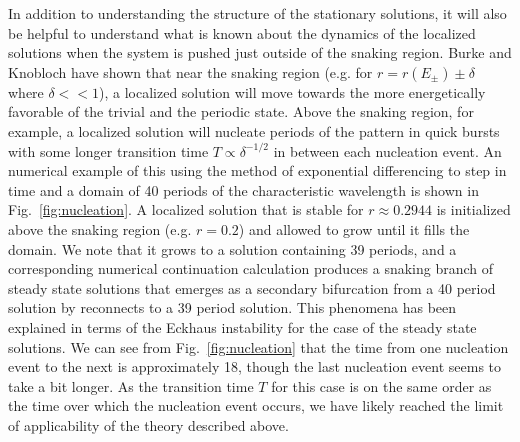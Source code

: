 \documentclass[pre,preprint,superscriptaddress]{revtex4-1}
\begin{document}
In addition to understanding the structure of the stationary solutions, it will also be helpful to understand what is known about the dynamics of the localized solutions when the system is pushed just outside of the snaking region.  Burke and Knobloch \cite{} have shown that near the snaking region (e.g. for $r=r(E_{\pm})\pm\delta$ where $\delta <<1$), a localized solution will move towards the more energetically favorable of the trivial and the periodic state.  Above the snaking region, for example, a localized solution will nucleate periods of the pattern in quick bursts with some longer transition time $T\propto \delta^{-1/2}$ in between each nucleation event.  An numerical example of this using the method of exponential differencing \cite{} to step in time and a domain of 40 periods of the characteristic wavelength is shown in Fig.~\ref{fig:nucleation}.  A localized solution that is stable for $r\approx 0.2944$ is initialized above the snaking region (e.g. $r=0.2$) and allowed to grow until it fills the domain. We note that it grows to a solution containing 39 periods, and a corresponding numerical continuation calculation produces a snaking branch of steady state solutions that emerges as a secondary bifurcation from a 40 period solution by reconnects to a 39 period solution.  This phenomena has been explained \cite{} in terms of the Eckhaus instability for the case of the steady state solutions.  We can see from Fig.~\ref{fig:nucleation} that the time from one nucleation event to the next is approximately 18, though the last nucleation event seems to take a bit longer.  As the transition time $T$ for this case is on the same order as the time over which the nucleation event occurs, we have likely reached the limit of applicability of the theory described above.
\end{document}
